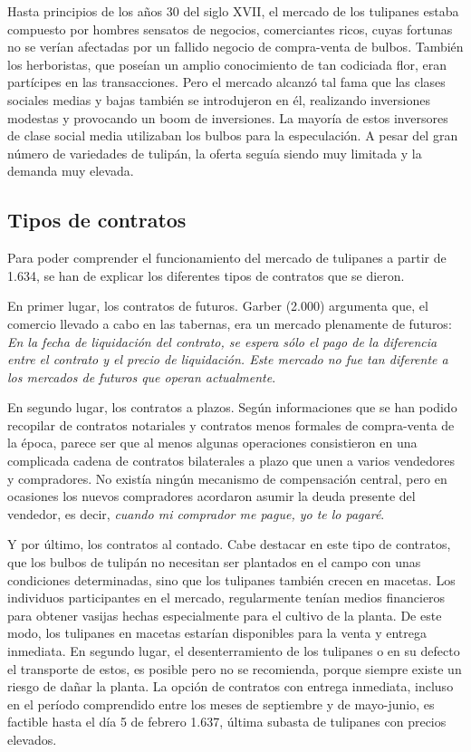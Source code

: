 Hasta principios de los años 30 del siglo XVII, el mercado de los tulipanes estaba compuesto por hombres sensatos de negocios, comerciantes ricos, cuyas fortunas no se verían afectadas por un fallido negocio de compra-venta de bulbos. También los herboristas, que poseían un amplio conocimiento de tan codiciada flor, eran partícipes en las transacciones. Pero el mercado alcanzó tal fama que las clases sociales medias y bajas también se introdujeron en él, realizando inversiones modestas y provocando un boom de inversiones. La mayoría de estos inversores de clase social media utilizaban los bulbos para la especulación. A pesar del gran número de variedades de tulipán, la oferta seguía siendo muy limitada y la demanda muy elevada.

\subsection{Tipos de contratos}

Para poder comprender el funcionamiento del mercado de tulipanes a partir de 1.634, se han de explicar los diferentes tipos de contratos que se dieron.

En primer lugar, los contratos de futuros. Garber (2.000) argumenta que, el comercio llevado a cabo en las tabernas, era un mercado plenamente de futuros: \emph{En la fecha de liquidación del contrato, se espera sólo el pago de la diferencia entre el contrato y el precio de liquidación. Este mercado no fue tan diferente a los mercados de futuros que operan actualmente}.

En segundo lugar, los contratos a plazos. Según informaciones que se han podido recopilar de contratos notariales y contratos menos formales de compra-venta de la época, parece ser que al menos algunas operaciones consistieron en una complicada cadena de contratos bilaterales a plazo que unen a varios vendedores y compradores. No existía ningún mecanismo de compensación central, pero en ocasiones los nuevos compradores acordaron asumir la deuda presente del vendedor, es decir, \emph{cuando mi comprador me pague, yo te lo pagaré}.

Y por último, los contratos al contado. Cabe destacar en este tipo de contratos, que los bulbos de tulipán no necesitan ser plantados en el campo con unas condiciones determinadas, sino que los tulipanes también crecen en macetas. Los individuos participantes en el mercado, regularmente tenían medios financieros para obtener vasijas hechas especialmente para el cultivo de la planta. De este modo, los tulipanes en macetas estarían disponibles para la venta y entrega inmediata. En segundo lugar, el desenterramiento de los tulipanes o en su defecto el transporte de estos, es posible pero no se recomienda, porque siempre existe un riesgo de dañar la planta. La opción de contratos con entrega inmediata, incluso en el período comprendido entre los meses de septiembre y de mayo-junio, es factible hasta el día 5 de febrero 1.637, última subasta de tulipanes con precios elevados.

